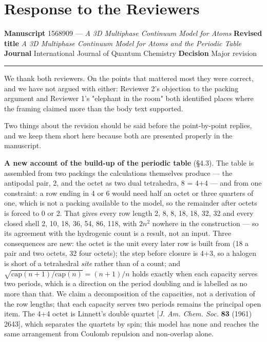 \documentclass[11pt,a4paper]{article}
\begin{document}
\section*{Response to the Reviewers}

\textbf{Manuscript} 1568909 --- \emph{A 3D Multiphase Continuum Model for Atoms}
\textbf{Revised title} \emph{A 3D Multiphase Continuum Model for Atoms and the Periodic Table}
\textbf{Journal} International Journal of Quantum Chemistry
\textbf{Decision} Major revision

\medskip\hrule\medskip

We thank both reviewers. On the points that mattered most they were correct, and we have not
argued with either: Reviewer 2's objection to the packing argument and Reviewer 1's "elephant in
the room" both identified places where the framing claimed more than the body text supported.

Two things about the revision should be said before the point-by-point replies, and we keep them
short here because both are presented properly in the manuscript.

\textbf{A new account of the build-up of the periodic table} (§4.3). The table is assembled from two
packings the calculations themselves produce --- the antipodal pair, 2, and the octet as two dual
tetrahedra, 8 = 4+4 --- and from one constraint: a row ending in 4 or 6 would need half an octet or
three quarters of one, which is not a packing available to the model, so the remainder after octets
is forced to 0 or 2. That gives every row length 2, 8, 8, 18, 18, 32, 32 and every closed shell
2, 10, 18, 36, 54, 86, 118, with $2n^2$ nowhere in the construction --- so its agreement with the
hydrogenic count is a result, not an input. Three consequences are new: the octet is the unit every
later row is built from (18 a pair and two octets, 32 four octets); the step before closure is 4+3,
so a halogen is short of a tetrahedral \emph{site} rather than of a count; and
$\sqrt{\mathrm{cap}(n{+}1)/\mathrm{cap}(n)}=(n{+}1)/n$ holds exactly when each capacity serves two
periods, which is a direction on the period doubling and is labelled as no more than that. We claim
a decomposition of the capacities, not a derivation of the row lengths; that each capacity serves two
periods remains the principal open item. The 4+4 octet is Linnett's double quartet [\emph{J. Am. Chem. Soc.} \textbf{83} (1961) 2643], which separates the quartets by spin; this model has none and reaches the
same arrangement from Coulomb repulsion and non-overlap alone.
\end{document}
